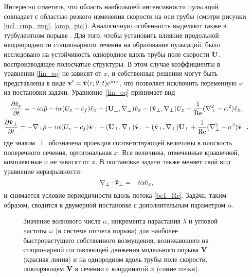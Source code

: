 Интересно отметить, что область наибольшей интенсивности пульсаций совпадает с областью резкого изменения скорости на оси трубы (смотри рисунки \ref{ucl_cmp_img}, \ref{amp_pic}). Аналогичную особенность выделяют также в турбулентном порыве \cite{Hof2010}. Для того, чтобы установить влияние продольной неоднородности стационарного течения на образование пульсаций, было исследовано на устойчивость однородное вдоль трубы поле скорости $\mathbf{U}$, воспроизводящее полосчатые структуры. В этом случае коэффициенты в уравнении \eqref{lin_eq} не зависят от $x$, и собственные решения могут быть представлены в виде $\mathbf{v}' = \hat {\mathbf{v}}(r,\theta,t) e^{i \alpha x}$, что позволяет исключить переменную $x$ из постановки задачи. Уравнение~\eqref{lin_eq} принимает вид
\begin{multline*}
\frac{\partial \hat v_x}{\partial t} = - i \alpha \hat p - i \alpha (U_x - c_f) \hat v_x - (\mathbf{U}_{\perp},\nabla_{\perp}) \hat v_x - 
(\hat {\mathbf{v}}_{\perp}, \nabla_{\perp}) U_x + \frac{1}{\operatorname{Re}}( \nabla_{\perp}^2 - \alpha^2 ) \hat v_x,
\end{multline*}
\begin{multline*}
\frac{\partial \hat {\mathbf{v}}_{\perp}}{\partial t} =  - \nabla_{\perp} \hat p - i \alpha (U_x - c_f) \hat {\mathbf{v}}_{\perp} - (\mathbf{U}_{\perp},\nabla_{\perp}) \hat {\mathbf{v}}_{\perp} - (\hat {\mathbf{v}}_{\perp}, \nabla_{\perp}) \mathbf{U}_{\perp} + \frac{1}{\operatorname{Re}}( \nabla_{\perp}^2 - \alpha^2 ) \hat {\mathbf{v}}_{\perp}, 
\end{multline*}
где знаком $\perp$ обозначена проекция соответствующей величины в плоскость поперечного сечения, ортогональная $x$. Все величины, отмеченные крышечкой, комплексные и не зависят от $x$. В постановке задачи также меняет свой вид уравнение неразрывности:
\begin{equation*}
\nabla_{\perp} \cdot \hat {\mathbf{v}}_{\perp} = - i \alpha \hat v_x, 
\end{equation*}
и снимается условие периодичности вдоль потока \eqref{bc1_Re}. Задача, таким образом, сводится к двумерной постановке с дополнительным параметром $\alpha$. 

\begin{figure}
\caption{Значение волнового числа $\alpha$, инкремента нарастания $\lambda$ и угловой частоты $\omega$ (в системе отсчета порыва) для наиболее быстрорастущего собственного возмущения, возникающего на стационарной составляющей движения модельного порыва $\mathbf{V}$ (красная линия) и на однородном вдоль трубы поле скорости, повторяющем $\mathbf{V}$ в сечении с координатой $x$ (синие точки).}
\label{cs_lin_pic}
\end{figure}

